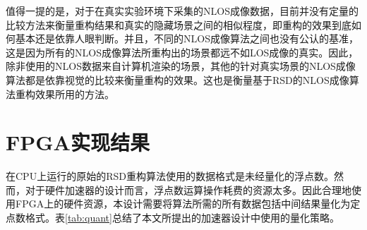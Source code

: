 \documentclass[master]{shtthesis}             %
\begin{document}
值得一提的是，对于在真实实验环境下采集的NLOS成像数据，目前并没有定量的比较方法来衡量重构结果和真实的隐藏场景之间的相似程度，即重构的效果到底如何基本还是依靠人眼判断。并且，不同的NLOS成像算法之间也没有公认的基准，这是因为所有的NLOS成像算法所重构出的场景都远不如LOS成像的真实。因此，除非使用的NLOS数据来自计算机渲染的场景，其他的针对真实场景的NLOS成像算法都是依靠视觉的比较来衡量重构的效果。这也是衡量基于RSD的NLOS成像算法重构效果所用的方法\citep{Liu,Liu2019}。

\section{FPGA实现结果}

在CPU上运行的原始的RSD重构算法使用的数据格式是未经量化的浮点数。然而，对于硬件加速器的设计而言，浮点数运算操作耗费的资源太多。因此合理地使用FPGA上的硬件资源，本设计需要将算法所需的所有数据包括中间结果量化为定点数格式。表\ref{tab:quant}总结了本文所提出的加速器设计中使用的量化策略。

\begin{table}[!t]
    \centering
    \label{tab:quant}
\end{table}
\end{document}
